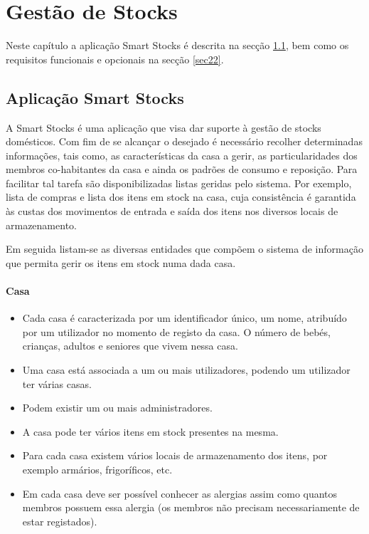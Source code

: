 %
%
\chapter{Gestão de Stocks} \label{cap2}

Neste capítulo a aplicação Smart Stocks é descrita na secção \ref{sec21}, bem como os requisitos funcionais e opcionais na secção \ref{sec22}.


%
%
\section{Aplicação Smart Stocks} \label{sec21}
A Smart Stocks é uma aplicação que visa dar suporte à gestão de stocks domésticos. Com fim de se alcançar o desejado é necessário recolher determinadas informações, tais como, as características da casa a gerir, as particularidades dos membros co-habitantes da casa e ainda os padrões de consumo e reposição. Para facilitar tal tarefa são disponibilizadas listas geridas pelo sistema. Por exemplo, lista de compras e lista dos itens em stock na casa, cuja consistência é garantida às custas dos movimentos de entrada e saída dos itens nos diversos locais de armazenamento.

Em seguida listam-se as diversas entidades que compõem o sistema de informação que permita gerir os itens em stock numa dada casa.
\subsubsection{Casa}
\begin{itemize}
	\item Cada casa é caracterizada por um identificador único, um nome, atribuído por um utilizador no momento de registo da casa. O número de bebés, crianças, adultos e seniores que vivem nessa casa.
	\item Uma casa está associada a um ou mais utilizadores, podendo um utilizador ter várias casas. 
	\item Podem existir um ou mais administradores.
	\item A casa pode ter vários itens em stock presentes na mesma.
	\item Para cada casa existem vários locais de armazenamento dos itens, por exemplo armários, frigoríficos, etc.
	\item Em cada casa deve ser possível conhecer as alergias assim como quantos membros possuem essa alergia (os membros não precisam necessariamente de estar registados).
\end{itemize}

